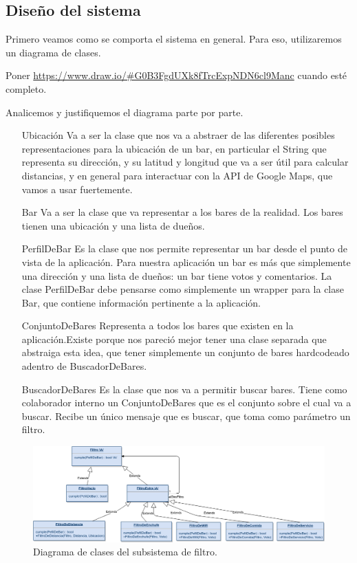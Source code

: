 \subsection{Diseño del sistema}

Primero veamos como se comporta el sistema en general. Para eso, utilizaremos un diagrama de clases.

{\color{red} Poner \url{https://www.draw.io/#G0B3FgdUXk8fTrcExpNDN6cl9Manc} cuando esté completo.}

Analicemos y justifiquemos el diagrama parte por parte.

\begin{itemize}
\item[Ubicación] Va a ser la clase que nos va a abstraer de las diferentes posibles representaciones para la ubicación de un bar, en particular el String que representa su dirección, y su latitud y longitud que va a ser útil para calcular distancias, y en general para interactuar con la API de Google Maps, que vamos a usar fuertemente.

\item[Bar] Va a ser la clase que va representar a los bares de la realidad. Los bares tienen una ubicación y una lista de dueños.

\item[PerfilDeBar] Es la clase que nos permite representar un bar desde el punto de vista de la aplicación. Para nuestra aplicación un bar es más que simplemente una dirección y una lista de dueños: un bar tiene votos y comentarios. La clase PerfilDeBar debe pensarse como simplemente un wrapper para la clase Bar, que contiene información pertinente a la aplicación.

\item[ConjuntoDeBares] Representa a todos los bares que existen en la aplicación.Existe porque nos pareció mejor tener una clase separada que abstraiga esta idea, que tener simplemente un conjunto de bares hardcodeado adentro de BuscadorDeBares.

\item[BuscadorDeBares] Es la clase que nos va a permitir buscar bares. Tiene como colaborador interno un ConjuntoDeBares que es el conjunto sobre el cual va a buscar. Recibe un único mensaje que es buscar, que toma como parámetro un filtro.
\end{itemize}


\begin{figure}[H]
  \centering
  \includegraphics[width=\textwidth]{diagramas/filtro_clases.png}
  \caption{\normalfont Diagrama de clases del subsistema de filtro.}
\end{figure}

